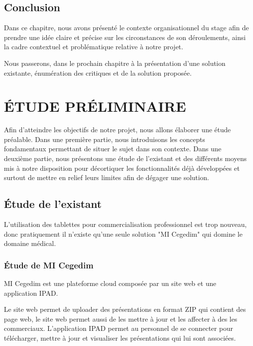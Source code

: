 \documentclass[12pt, ChapStyle1, oneside]{./Styles/Dea_Gsm}
\begin{document}
\section{Conclusion}
Dans ce chapitre, nous avons présenté le contexte organisationnel du stage afin de prendre une idée claire et précise sur les circonstances de son déroulements, ainsi la cadre contextuel et problématique relative à notre projet.


Nous passerons, dans le prochain chapitre à la présentation d’une solution existante, énumération des critiques et de la solution proposée.

\chapter{ÉTUDE PRÉLIMINAIRE}
\vspace*{3cm}
Afin d'atteindre les objectifs de notre projet, nous allons élaborer une étude préalable. Dans une première partie, nous introduisons les concepts fondamentaux permettant de situer le sujet dans son contexte. Dans une deuxième partie, nous présentons une étude de l'existant et des différents moyens mis à notre disposition pour décortiquer les fonctionnalités déjà développées et surtout de mettre en relief leurs limites afin de dégager une solution.
\pagebreak

\section{Étude de l’existant}
L’utilisation des tablettes pour commercialisation professionnel est trop nouveau, donc pratiquement il n’existe qu’une seule solution "MI Cegedim" qui domine le domaine médical.

\subsection{Étude de MI Cegedim}

MI Cegedim est une plateforme cloud composée par un site web et une application IPAD.

Le site web permet de uploader des présentations en format ZIP qui contient des page web, le site web permet aussi de les mettre à jour et les affecter à des les commerciaux. L’application IPAD permet au personnel de se connecter pour télécharger, mettre à jour et visualiser les présentations qui lui sont associées.
\end{document}
